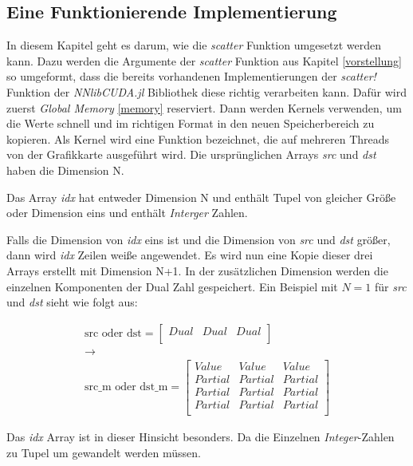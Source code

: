 \subsection{Eine Funktionierende Implementierung}

In diesem Kapitel geht es darum, wie die \textit{scatter} Funktion umgesetzt werden kann.
Dazu werden die Argumente der \textit{scatter} Funktion aus Kapitel \ref{vorstellung} so
umgeformt, 
dass die bereits vorhandenen Implementierungen der \textit{scatter!} Funktion der \textit{NNlibCUDA.jl} \cite{nnlibcuda} Bibliothek 
diese richtig verarbeiten kann.
Dafür wird zuerst \textit{Global Memory} \ref{memory} reserviert. Dann werden Kernels verwenden, 
um die Werte schnell und im richtigen Format in den neuen Speicherbereich zu kopieren.
Als Kernel wird eine Funktion bezeichnet, die auf mehreren Threads von der Grafikkarte ausgeführt wird.
Die ursprünglichen Arrays \textit{src} und \textit{dst} haben die Dimension N.

Das Array \textit{idx} hat entweder Dimension N und enthält Tupel von gleicher Größe
oder Dimension eins und enthält \textit{Interger} Zahlen.

Falls die Dimension von \textit{idx} eins ist und die Dimension von \textit{src}
und \textit{dst} größer, dann wird \textit{idx} Zeilen weiße angewendet.
Es wird nun eine Kopie dieser drei Arrays erstellt mit Dimension N+1.
In der zusätzlichen Dimension werden die einzelnen Komponenten der Dual Zahl gespeichert.
Ein Beispiel mit $N = 1$ für \textit{src} und \textit{dst} sieht wie folgt aus:


\begin{gather}
\text{src oder dst} = 
\begin{bmatrix}
Dual & Dual & Dual\\
\end{bmatrix}\\
\rightarrow\\
\text{src\_m oder dst\_m} = 
\begin{bmatrix}
Value   & Value   & Value   \\
Partial & Partial & Partial \\
Partial & Partial & Partial \\
Partial & Partial & Partial \\
\end{bmatrix}
\end{gather}


Das \textit{idx} Array ist in dieser Hinsicht besonders.
Da die Einzelnen \textit{Integer}-Zahlen zu Tupel um gewandelt werden müssen.

